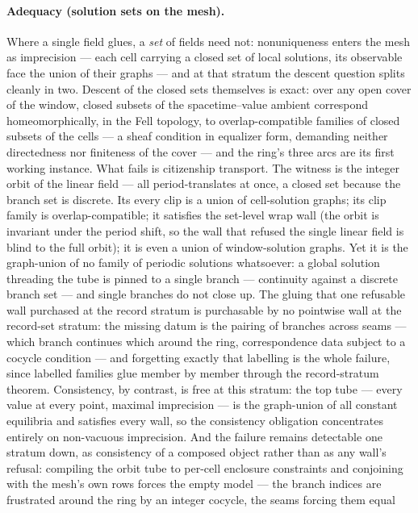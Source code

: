 \paragraph{Adequacy (solution sets on the mesh).} Where a single
field glues, a \emph{set} of fields need not: nonuniqueness enters
the mesh as imprecision --- each cell carrying a closed set of local
solutions, its observable face the union of their graphs --- and at
that stratum the descent question splits cleanly in two.  Descent of
the closed sets themselves is exact: over any open cover of the
window, closed subsets of the spacetime--value ambient correspond
homeomorphically, in the Fell topology, to overlap-compatible
families of closed subsets of the cells --- a sheaf condition in
equalizer form, demanding neither directedness nor finiteness of the
cover --- and the ring's three arcs are its first working instance.
What fails is citizenship transport.  The witness is the integer
orbit of the linear field --- all period-translates at once, a
closed set because the branch set is discrete.  Its every clip is a
union of cell-solution graphs; its clip family is
overlap-compatible; it satisfies the set-level wrap wall (the orbit
is invariant under the period shift, so the wall that refused the
single linear field is blind to the full orbit); it is even a union
of window-solution graphs.  Yet it is the graph-union of no family
of periodic solutions whatsoever: a global solution threading the
tube is pinned to a single branch --- continuity against a discrete
branch set --- and single branches do not close up.  The gluing that
one refusable wall purchased at the record stratum is purchasable by
no pointwise wall at the record-set stratum: the missing datum is
the pairing of branches across seams --- which branch continues
which around the ring, correspondence data subject to a cocycle
condition --- and forgetting exactly that labelling is the whole
failure, since labelled families glue member by member through the
record-stratum theorem.  Consistency, by contrast, is free at this
stratum: the top tube --- every value at every point, maximal
imprecision --- is the graph-union of all constant equilibria and
satisfies every wall, so the consistency obligation concentrates
entirely on non-vacuous imprecision.  And the failure remains
detectable one stratum down, as consistency of a composed object
rather than as any wall's refusal: compiling the orbit tube to
per-cell enclosure constraints and conjoining with the mesh's own
rows forces the empty model --- the branch indices are frustrated
around the ring by an integer cocycle, the seams forcing them equal
